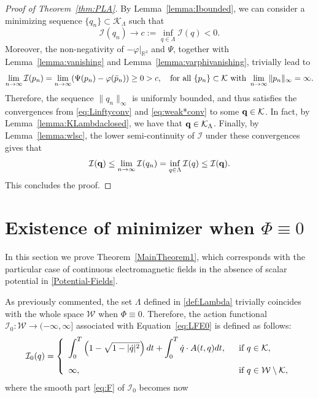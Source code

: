 \documentclass{article}
\newcommand{\boK}{\mathcal{K}}
\newcommand{\boI}{\mathcal{I}}
\newcommand{\R}{\mathbb{R}}
\newcommand{\boW}{\mathcal{W}}
\newcommand{\dq}{\dot{q}}
\theoremstyle{definition}
\begin{document}
\begin{proof}[Proof of Theorem~\ref{thm:PLA}]
    By Lemma~\ref{lemma:Ibounded}, we can consider a minimizing sequence $\{q_n\}\subset\boK_\Lambda$ such that
    \begin{equation}
        \boI(q_n)\to c:=\inf\limits_{q\in\Lambda}\boI(q)<0.
    \end{equation}    
     Moreover, the non-negativity of $-\left.\varphi\right|_{\R^3}$ and $\Psi$, together with Lemma~\ref{lemma:vanishing} and Lemma~\ref{lemma:varphivanishing}, trivially lead to
\begin{equation}
	\lim\limits_{n\to\infty}\boI(p_n)=\lim\limits_{n\to\infty}(\Psi(p_n)-\varphi(\bar p_n))\geq0>c,\quad\hbox{for all }\{p_n\}\subset\boK\hbox{ with }\lim\limits_{n\to\infty}\|p_n\|_\infty=\infty.
\end{equation}
Therefore, the sequence $\|q_n\|_\infty$ is uniformly bounded, and thus satisfies the convergences from \eqref{eq:Linftyconv} and \eqref{eq:weak*conv} to some ${\bf q}\in\boK$. In fact, by Lemma~\ref{lemma:KLambdaclosed}, we have that ${\bf q}\in\boK_\Lambda$. Finally, by Lemma~\ref{lemma:wlsc}, the lower semi-continuity of $\boI$ under these convergences gives that
\begin{equation}
    \boI({\bf q})\leq\lim\limits_{n\to\infty}\boI(q_n)=\inf\limits_{q\in\Lambda}\boI(q)\leq\boI({\bf q}).
\end{equation}
This concludes the proof.
\end{proof}





\section{Existence of minimizer when \texorpdfstring{$\Phi\equiv 0$}{Phi = 0}}\label{SectionMinimum}

In this section we prove Theorem~\ref{MainTheorem1}, which corresponds with the particular case of continuous electromagnetic fields in the absence of scalar potential in \eqref{Potential-Fields}.

As previously commented, the set $\Lambda$ defined in \eqref{def:Lambda} trivially coincides with the whole space $\boW$ when $\Phi\equiv0$. Therefore, the action functional $\boI_0 : \boW \to (-\infty, \infty]$ associated with Equation~\eqref{eq:LFE0} is defined as follows:
\begin{equation}\label{eq:functional-ZeroPhi}
    \boI_0(q)=\left\{\begin{array}{ll}
    	\displaystyle\int_0^T \left(1-\sqrt{1-|\dq|^2}\right)dt + \displaystyle\int_0^T \dq\cdot A(t,q)dt, \ &\text{ if }q\in\boK,\vspace{0.3cm}\\
    	\infty, &\text{ if }q\in\boW\setminus\boK,
    \end{array}\right.
\end{equation}
where the smooth part \eqref{eq:F} of $\boI_0$ becomes now
\end{document}
